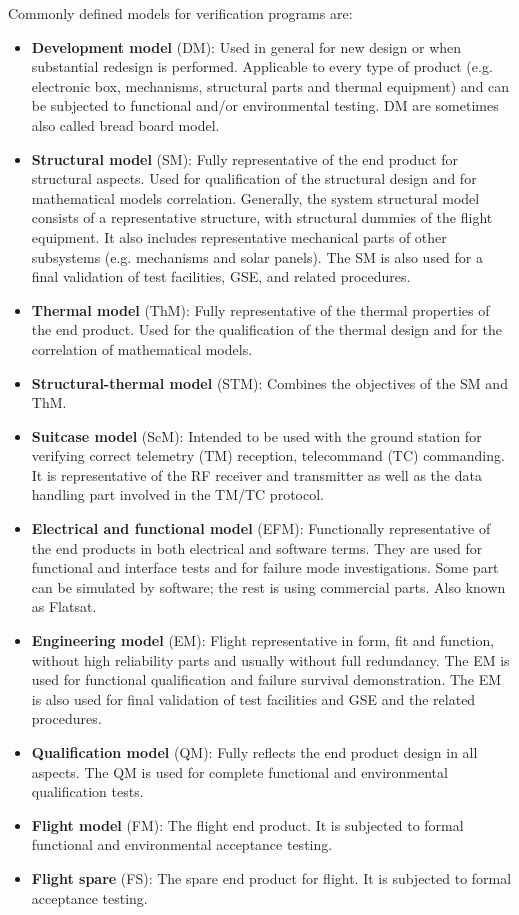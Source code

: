 Commonly defined models for verification programs are:

\begin{itemize}
\item \textbf{Development model} (DM): Used in general for new design or when substantial redesign is performed. Applicable to every type of product (e.g. electronic box, mechanisms, structural parts and thermal equipment) and can be subjected to functional and/or environmental testing. DM are sometimes also called bread board model.
\item \textbf{Structural model} (SM): Fully representative of the end product for structural aspects. Used for qualification of the structural design and for mathematical models correlation. Generally, the system structural model consists of a representative structure, with structural dummies of the flight equipment. It also includes representative mechanical parts of other subsystems (e.g. mechanisms and solar panels). The SM is also used for a final validation of test facilities, GSE, and related procedures.
\item \textbf{Thermal model} (ThM): Fully representative of the thermal properties of the end product. Used for the qualification of the thermal design and for the correlation of mathematical models. 
\item \textbf{Structural-thermal model} (STM): Combines the objectives of the SM and ThM.
\item \textbf{Suitcase model} (ScM): Intended to be used with the ground station for verifying correct telemetry (TM) reception, telecommand (TC) commanding. It is representative of the RF receiver and transmitter as well as the data handling part involved in the TM/TC protocol. 
\item \textbf{Electrical and functional model} (EFM): Functionally representative of the end products in both electrical and software terms. They are used for functional and interface tests and for failure mode investigations. Some part can be simulated by software; the rest is using commercial parts. Also known as Flatsat.
\item \textbf{Engineering model} (EM): Flight representative in form, fit and function, without high reliability parts and usually without full redundancy. The EM is used for functional qualification and failure survival demonstration. The EM is also used for final validation of test facilities and GSE and the related procedures.
\item \textbf{Qualification model} (QM): Fully reflects the end product design in all aspects. The QM is
used for complete functional and environmental qualification tests. 
\item \textbf{Flight model} (FM): The flight end product. It is subjected to formal functional and environmental acceptance testing. 
\item \textbf{Flight spare} (FS): The spare end product for flight. It is subjected to formal acceptance testing.
\end{itemize}


